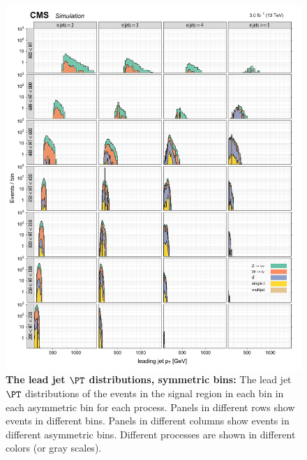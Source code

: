 \begin{figure}[!h]
\centering
\includegraphics[scale=0.95]{figures/kiplots/c150107_s150318_f015_jet_pt_0_40}
\caption{\textbf{\boldmath The lead jet $\PT$ distributions, symmetric
\njet bins:} The lead jet $\PT$ distributions of the events in the
signal region in each \scalht bin in each asymmetric \njet bin for each
process. Panels in different rows show events in different \scalht bins.
Panels in different columns show events in different asymmetric \njet
bins. Different processes are shown in different colors (or gray
scales).} \label{c150107_s150318_f015_jet_pt_0_40}
\end{figure}

